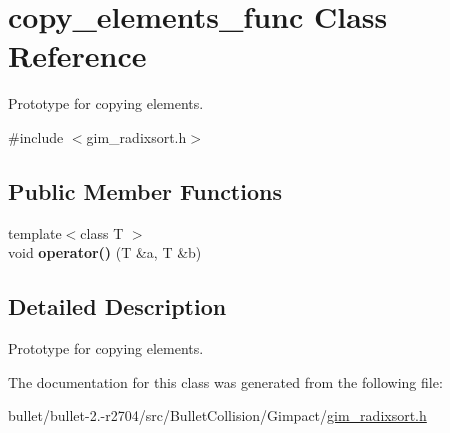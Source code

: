 \hypertarget{classcopy__elements__func}{\section{copy\+\_\+elements\+\_\+func Class Reference}
\label{classcopy__elements__func}
}


Prototype for copying elements.  




{\ttfamily \#include $<$gim\+\_\+radixsort.\+h$>$}

\subsection*{Public Member Functions}
\begin{DoxyCompactItemize}
\item 
\hypertarget{classcopy__elements__func_abbcb17956cf9db4e3d9aff17ca2aedcd}{{\footnotesize template$<$class T $>$ }\\void {\bfseries operator()} (T \&a, T \&b)}\label{classcopy__elements__func_abbcb17956cf9db4e3d9aff17ca2aedcd}

\end{DoxyCompactItemize}


\subsection{Detailed Description}
Prototype for copying elements. 

The documentation for this class was generated from the following file\+:\begin{DoxyCompactItemize}
\item 
bullet/bullet-\/2.-\/r2704/src/\+Bullet\+Collision/\+Gimpact/\hyperlink{gim__radixsort_8h}{gim\+\_\+radixsort.\+h}\end{DoxyCompactItemize}
